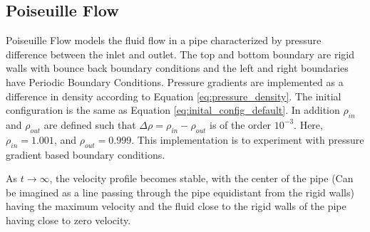 \documentclass[a4paper,11pt]{report}
\begin{document}
\subsection{Poiseuille Flow}
Poiseuille Flow models the fluid flow in a pipe characterized by pressure difference between the inlet and outlet. The top and bottom boundary are rigid walls with bounce back boundary conditions and the left and right boundaries have Periodic Boundary Conditions. Pressure gradients are implemented as a difference in density according to Equation \ref{eq:pressure_density}. The initial configuration is the same as Equation \ref{eq:inital_config_default}. In addition $\rho_{in}$ and $\rho_{out}$ are defined such that $\Delta \rho = \rho_{in} - \rho_{out}$ is of the order $10^{-3}$. Here, $\rho_{in} = 1.001$, and $\rho_{out} = 0.999$. This implementation is to experiment with pressure gradient based boundary conditions.

As $t \rightarrow \infty$, the velocity profile becomes stable, with the center of the pipe (Can be imagined as a line passing through the pipe equidistant from the rigid walls) having the maximum velocity and the fluid close to the rigid walls of the pipe having close to zero velocity. 
\end{document}
